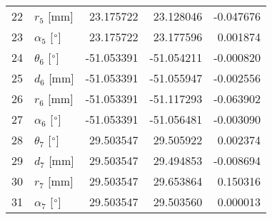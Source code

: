 \documentclass{standalone}%
\begin{document}
\begin{tabular}{llrrr}
22 &              $r_{5}$ [mm] &  23.175722 &  23.128046 &  -0.047676 \\
23 &  $\alpha_{5}$ [$\degree$] &  23.175722 &  23.177596 &   0.001874 \\
24 &  $\theta_{6}$ [$\degree$] & -51.053391 & -51.054211 &  -0.000820 \\
25 &              $d_{6}$ [mm] & -51.053391 & -51.055947 &  -0.002556 \\
26 &              $r_{6}$ [mm] & -51.053391 & -51.117293 &  -0.063902 \\
27 &  $\alpha_{6}$ [$\degree$] & -51.053391 & -51.056481 &  -0.003090 \\
28 &  $\theta_{7}$ [$\degree$] &  29.503547 &  29.505922 &   0.002374 \\
29 &              $d_{7}$ [mm] &  29.503547 &  29.494853 &  -0.008694 \\
30 &              $r_{7}$ [mm] &  29.503547 &  29.653864 &   0.150316 \\
31 &  $\alpha_{7}$ [$\degree$] &  29.503547 &  29.503560 &   0.000013 \\
\bottomrule
\end{tabular}
%
\end{document}
